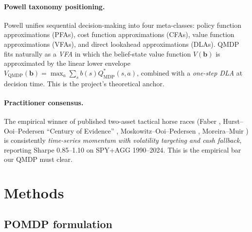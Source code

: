 \documentclass[11pt]{article}
\theoremstyle{plain1}
\theoremstyle{definition1}
\newcommand{\1}{\mathbf{1}}
\newcommand{\bel}{\mathbf{b}}
\begin{document}
\paragraph{Powell taxonomy positioning.} Powell \cite{powell2019} unifies sequential decision-making into four meta-classes: policy function approximations (PFAs), cost function approximations (CFAs), value function approximations (VFAs), and direct lookahead approximations (DLAs). QMDP fits naturally as a \emph{VFA} in which the belief-state value function $V(\bel)$ is approximated by the linear lower envelope $V_{\mathrm{QMDP}}(\bel) = \max_a \sum_s b(s) Q^\ast_{\mathrm{MDP}}(s,a)$, combined with a \emph{one-step DLA} at decision time. This is the project's theoretical anchor.

\paragraph{Practitioner consensus.} The empirical winner of published two-asset tactical horse races (Faber \cite{faber2007}, Hurst--Ooi--Pedersen ``Century of Evidence'' \cite{hurst2017}, Moskowitz--Ooi--Pedersen \cite{moskowitz2012}, Moreira--Muir \cite{moreira2017}) is consistently \emph{time-series momentum with volatility targeting and cash fallback}, reporting Sharpe 0.85--1.10 on SPY+AGG 1990--2024. This is the empirical bar our QMDP must clear.

\section{Methods}\label{sec:methods}

\subsection{POMDP formulation}\label{sec:pomdp}
\end{document}
